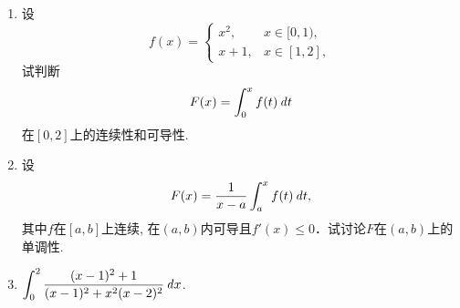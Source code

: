 \documentclass[a4paper,punct=CCT]{ctexbook}
\theoremstyle{definition}
\theoremstyle{remark}
\newif\ifshowsol
\let\leq\leqslant
\let\le\leq
\begin{document}
\begin{enumerate}
\item 设
  \[
    f(x) =
    \begin{cases}
      x^2, & x \in [0,1), \\
      x+1, & x \in [1,2],
    \end{cases}
  \]
  试判断
  \[
    F(x) = \int_0^x f(t) \mathop{}\!\mathit{d} t
  \]
  在\([0,2]\)上的连续性和可导性.

  \ifshowsol
  对于这个简单的函数, 我们可以写出它的表达式
  \[
    F(x) =
    \begin{cases}
      \frac13 x^3, & x \in [0,1), \\
      \frac12 x^2 + x - \frac76, & x \in [1,2].
    \end{cases}
  \]
  所以易知\(\lim_{x\to1} F(x) = F(1) = \frac13\)和\(F'_-(1) = 1 \ne 2 = F'_+(1)\)．那么\(F\)在\([0,2]\)上连续, 导函数在\(x=1\)处存在第一类间断点.
  \fi

\item 设
  \[
    F(x) = \frac1{x-a} \int_a^x f(t) \mathop{}\!\mathit{d} t,
  \]
  其中\(f\)在\([a,b]\)上连续, 在\((a,b)\)内可导且\(f'(x) \le 0\)．试讨论\(F\)在\((a,b)\)上的单调性.

  \ifshowsol
  对该函数求导, 得到
  \[
    \ddx F(x) = \frac{f(x)(x-a) - \int_a^x f(t) \dt}{(x-a)^2}.
  \]
  因为\(f\)在\((a,b)\)上单调递减, 所以
  \[
    f(x)(x-a) \le \int_a^x f(t) \dt.
  \]
  这就意味着\(\ddx F(x) \le 0\), 也就是说\(F\)在\((a,b)\)上单调递减.
  \fi

\item \(\displaystyle \int_0^2 \frac{(x-1)^2 + 1}{(x-1)^2 + x^2 (x-2)^2} \mathop{}\!\mathit{d} x\).

  \ifshowsol
  设被积函数为\(f\,\), 那么根据定积分的性质就有
  \[
    \begin{split}
      \int_0^2 f(x) \dx
      &= \int_{-1}^1 f(x+1) \dx
      = \int_{-1}^1 \frac{x^2 + 1}{x^2 + (x+1)^2 (x-1)^2} \dx \\
      &= 2 \int_0^1 \frac{x^2 + 1}{x^2 + (x+1)^2 (x-1)^2} \dx
      = 2 \int_0^1 \frac{1 + \frac{1}{x^2}}{1 + \paren[\big]{\frac{x^2-1}{x}}^2} \dx \\
      &= 2 \int_0^1 \frac{1 + \frac{1}{x^2}}{1 + \paren[\big]{x - \frac{1}{x}}^2} \dx
      = 2 \int_0^1 \frac{\diff\paren[\big]{x - \frac{1}{x}}}{1 + \paren[\big]{x - \frac{1}{x}}^2} \\
      &= 2 \arctan\paren[\Big]{x - \frac{1}{x}}\bigg\vert_0^1
      = 2 \brkt[\Big]{0 - \paren[\Big]{-\frac{\pi}{2}}} \\
      &= \pi.
    \end{split}
  \]
  易知平移后的函数\(f(x+1)\)是一个偶函数.
  \fi


\end{enumerate}
\end{document}
